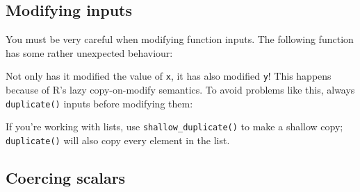 \subsection{Modifying inputs}

You must be very careful when modifying function inputs. The following
function has some rather unexpected behaviour:

\begin{Shaded}
\begin{Highlighting}[]
\StringTok{ }\NormalTok{(}\NormalTok{(} \NormalTok{), }
\NormalTok{)}
\StringTok{ }
\StringTok{ }
\end{Highlighting}
\end{Shaded}

Not only has it modified the value of \texttt{x}, it has also modified
\texttt{y}! This happens because of R's lazy copy-on-modify semantics.
To avoid problems like this, always \texttt{duplicate()} inputs before
modifying them:

\begin{Shaded}
\begin{Highlighting}[]
\StringTok{ }\NormalTok{(}\NormalTok{(} \NormalTok{), }
\NormalTok{)}
\StringTok{ }
\StringTok{ }
\end{Highlighting}
\end{Shaded}

If you're working with lists, use \texttt{shallow\_duplicate()} to make
a shallow copy; \texttt{duplicate()} will also copy every element in the
list.

\subsection{Coercing scalars}

